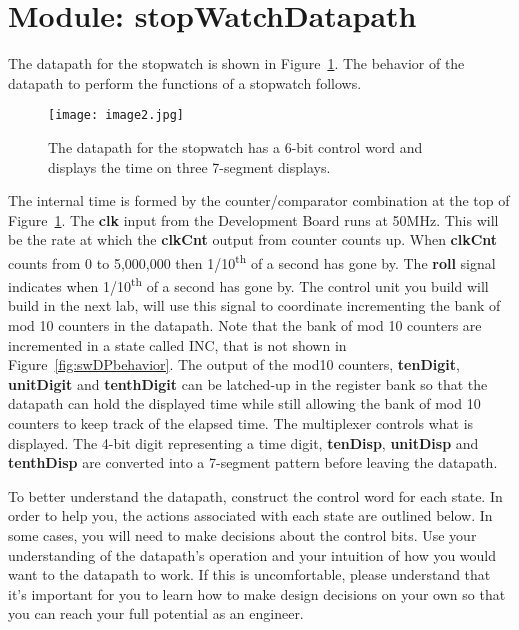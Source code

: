 \section{Module: stopWatchDatapath}

The datapath for the stopwatch is shown in Figure~\ref{fig:dpSWdatpath}. The behavior of the
datapath to perform the functions of a stopwatch follows.

\begin{figure}[ht]
\texttt{[image:  image2.jpg]}
\caption{The datapath for the stopwatch has a 6-bit control word and
displays the time on three 7-segment displays.}
\label{fig:dpSWdatpath}
\end{figure}

The internal time is formed by the counter/comparator combination at the
top of Figure~\ref{fig:dpSWdatpath}. The \textbf{clk} input from the Development Board runs
at 50MHz. This will be the rate at which the \textbf{clkCnt} output from
counter counts up. When \textbf{clkCnt} counts from 0 to 5,000,000 then
1/10\textsuperscript{th} of a second has gone by. The \textbf{roll}
signal indicates when 1/10\textsuperscript{th} of a second has gone by.
The control unit you build will build in the next lab, will use this
signal to coordinate incrementing the bank of mod 10 counters in the
datapath. Note that the bank of mod 10 counters are incremented in a
state called INC, that is not shown in Figure~\ref{fig:swDPbehavior}. The output of the mod10
counters, \textbf{tenDigit}, \textbf{unitDigit} and \textbf{tenthDigit}
can be latched-up in the register bank so that the datapath can hold the
displayed time while still allowing the bank of mod 10 counters to keep
track of the elapsed time. The multiplexer controls what is displayed.
The 4-bit digit representing a time digit, \textbf{tenDisp},
\textbf{unitDisp} and \textbf{tenthDisp} are converted into a 7-segment
pattern before leaving the datapath.

To better understand the datapath, construct the control word for each
state. In order to help you, the actions associated with each state are
outlined below. In some cases, you will need to make decisions about the
control bits. Use your understanding of the datapath's operation and
your intuition of how you would want to the datapath to work. If this is
uncomfortable, please understand that it's important for you to learn
how to make design decisions on your own so that you can reach your full
potential as an engineer.

